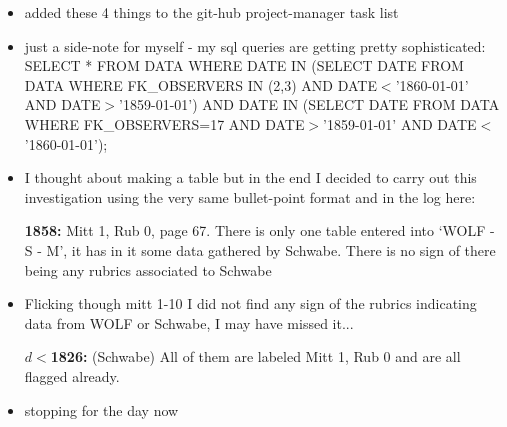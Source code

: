 \documentclass[12pt]{article}
\begin{document}
\begin{itemize}
    \item added these 4 things to the git-hub project-manager task list
    \item just a side-note for myself - my sql queries are getting pretty sophisticated: SELECT * FROM DATA WHERE DATE IN (SELECT DATE FROM DATA WHERE FK\_OBSERVERS IN (2,3) AND DATE$<$'1860-01-01' AND DATE$>$'1859-01-01') AND DATE IN (SELECT DATE FROM DATA WHERE FK\_OBSERVERS=17 AND DATE$>$'1859-01-01' AND DATE$<$'1860-01-01');
    \item I thought about making a table but in the end I decided to carry out this investigation using the very same bullet-point format and in the log here:
    \item[\textbf{1858:}] Mitt 1, Rub 0, page 67. There is only one table entered into `WOLF - S - M', it has in it some data gathered by Schwabe. There is no sign of there being any rubrics associated to Schwabe
    \item Flicking though mitt 1-10 I did not find any sign of the rubrics indicating data from WOLF or Schwabe, I may have missed it...
    \item[\textbf{$d<$1826:}] (Schwabe) All of them are labeled Mitt 1, Rub 0 and are all flagged already.
    \item stopping for the day now
\end{itemize}
\end{document}
